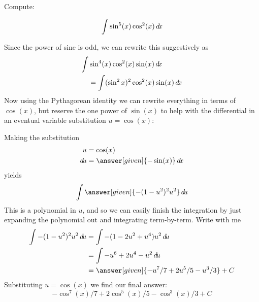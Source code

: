 \documentclass{ximera}
\begin{document}
\begin{example}
  Compute:

  \[
  \int \sin^{5}(x) \cos^2(x) \mathop{}\!d\! x
  \]

  \begin{explanation}
   
    Since the power of sine is odd, we can rewrite this suggestively as
    \begin{align*}
    \int &\sin^4(x) \cos^2(x) \sin(x) \mathop{}\!d\! x \\
    &= \int (\sin^2x)^2 \cos^2(x) \sin(x) \mathop{}\!d\! x
    \end{align*}
    Now using the Pythagorean identity we can rewrite everything in
    terms of $\cos(x)$, but reserve the one power of $\sin(x)$ to help
    with the differential in an eventual variable substitution $u=\cos(x)$:
    \begin{center}%
    \end{center}
    Making the substitution
    \begin{align*}
      u &= \cos(x)\\
      \d u &=\answer[given]{-\sin(x)} \d x
    \end{align*}
    yields
    \[
    \int \answer[given]{-(1-u^2)^2 u^2} \d u
    \]
    This is a polynomial in $u$, and so we can easily finish the
    integration by just expanding the polynomial out and integrating
    term-by-term. Write with me
    \begin{align*}
      \int {-(1-u^2)^2 u^2} \d u &= \int -(1-2u^2+u^4)u^2\d u\\
      &= \int-u^6 + 2u^4-u^2 \d u\\
      &=\answer[given]{-u^7/7 + 2u^5/5 - u^3/3}+C
    \end{align*}
    Substituting $u = \cos(x)$ we find our final answer:
    \[
    -\cos^7(x)/7 + 2\cos^5(x)/5 - \cos^3(x)/3+C
    \]
  \end{explanation}
\end{example}
\end{document}
